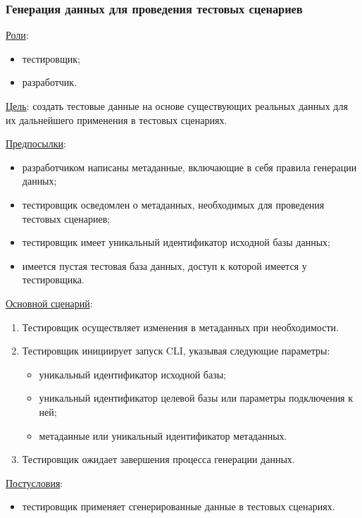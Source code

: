\subsubsection{Генерация данных для проведения тестовых сценариев}

\underline{Роли}:

\begin{itemize}
    \item тестировщик;
    \item разработчик.
\end{itemize}

\underline{Цель}: создать тестовые данные на основе существующих реальных данных для их дальнейшего применения в тестовых сценариях.

\underline{Предпосылки}:

\begin{itemize}
    \item разработчиком написаны метаданные, включающие в себя правила генерации данных;
    \item тестировщик осведомлен о метаданных, необходимых для проведения тестовых сценариев;
    \item тестировщик имеет уникальный идентификатор исходной базы данных;
    \item имеется пустая тестовая база данных, доступ к которой имеется у тестировщика.
\end{itemize}

\underline{Основной сценарий}:

\begin{enumerate}
    \item Тестировщик осуществляет изменения в метаданных при необходимости.
    \item Тестировщик инициирует запуск CLI, указывая следующие параметры:
    \begin{itemize}
        \item уникальный идентификатор исходной базы;
        \item уникальный идентификатор целевой базы или параметры подключения к ней;
        \item метаданные или уникальный идентификатор метаданных.
    \end{itemize}
    \item Тестировщик ожидает завершения процесса генерации данных.
\end{enumerate}

\underline{Постусловия}:

\begin{itemize}
    \item тестировщик применяет сгенерированные данные в тестовых сценариях.
\end{itemize}

